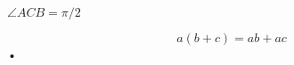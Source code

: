 \documentclass[UTF8]{ctexart}
\begin{document}
$\angle ACB = \pi / 2$

\begin{equation}
	a(b+c) = ab + ac
\end{equation}•
\end{document}
